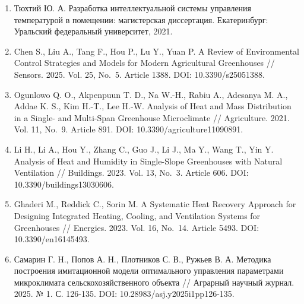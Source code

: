 \documentclass[a4paper,14pt]{extarticle}
\begin{document}
\begin{enumerate}
  10.1371/journal.pone.0344946.
\item
  Тюхтий Ю. А. Разработка интеллектуальной системы управления
  температурой в помещении: магистерская диссертация. Екатеринбург:
  Уральский федеральный университет, 2021.
\item
  Chen S., Liu A., Tang F., Hou P., Lu Y., Yuan P. A Review of
  Environmental Control Strategies and Models for Modern Agricultural
  Greenhouses // Sensors. 2025. Vol. 25, No.~5. Article 1388. DOI:
  10.3390/s25051388.
\item
  Ogunlowo Q. O., Akpenpuun T. D., Na W.-H., Rabiu A., Adesanya M. A.,
  Addae K. S., Kim H.-T., Lee H.-W. Analysis of Heat and Mass
  Distribution in a Single- and Multi-Span Greenhouse Microclimate //
  Agriculture. 2021. Vol. 11, No.~9. Article 891. DOI:
  10.3390/agriculture11090891.
\item
  Li H., Li A., Hou Y., Zhang C., Guo J., Li J., Ma Y., Wang T., Yin Y.
  Analysis of Heat and Humidity in Single-Slope Greenhouses with Natural
  Ventilation // Buildings. 2023. Vol. 13, No.~3. Article 606. DOI:
  10.3390/buildings13030606.
\item
  Ghaderi M., Reddick C., Sorin M. A Systematic Heat Recovery Approach
  for Designing Integrated Heating, Cooling, and Ventilation Systems for
  Greenhouses // Energies. 2023. Vol. 16, No.~14. Article 5493. DOI:
  10.3390/en16145493.
\item
  Самарин Г. Н., Попов А. Н., Плотников С. В., Ружьев В. А. Методика
  построения имитационной модели оптимального управления параметрами
  микроклимата сельскохозяйственного объекта // Аграрный научный журнал.
  2025. № 1. С. 126-135. DOI: 10.28983/asj.y2025i1pp126-135.
\end{enumerate}
\end{document}
